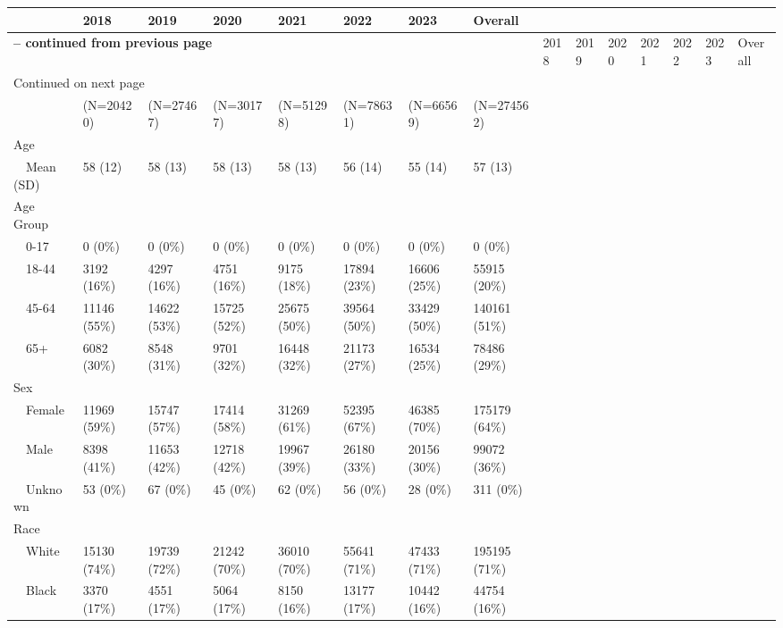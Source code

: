\begin{longtable}{p{}p{}p{}p{}p{}p{}p{}p{}}
   & 2018 & 2019 & 2020 & 2021 & 2022 & 2023 & Overall \\ 
  \hline 
\endfirsthead 
\multicolumn{8}{p{\textwidth}}{{ \bfseries \tablename \thetable{} -- continued from previous page}} \ 
\hline Feature & 2018 & 2019 & 2020 & 2021 & 2022 & 2023 & Overall \\ \hline 
\endhead 
\hline \multicolumn{8}{p{\textwidth}}{{Continued on next page}} \\ \hline 
\endfoot 
\hline 
\endlastfoot 
 \hline
 & (N=20420) & (N=27467) & (N=30177) & (N=51298) & (N=78631) & (N=66569) & (N=274562) \\ 
  Age &  &  &  &  &  &  &  \\ 
    Mean (SD) & 58 (12) & 58 (13) & 58 (13) & 58 (13) & 56 (14) & 55 (14) & 57 (13) \\ 
  Age Group &  &  &  &  &  &  &  \\ 
    0-17 & 0 (0\%) & 0 (0\%) & 0 (0\%) & 0 (0\%) & 0 (0\%) & 0 (0\%) & 0 (0\%) \\ 
    18-44 & 3192 (16\%) & 4297 (16\%) & 4751 (16\%) & 9175 (18\%) & 17894 (23\%) & 16606 (25\%) & 55915 (20\%) \\ 
    45-64 & 11146 (55\%) & 14622 (53\%) & 15725 (52\%) & 25675 (50\%) & 39564 (50\%) & 33429 (50\%) & 140161 (51\%) \\ 
    65+ & 6082 (30\%) & 8548 (31\%) & 9701 (32\%) & 16448 (32\%) & 21173 (27\%) & 16534 (25\%) & 78486 (29\%) \\ 
  Sex &  &  &  &  &  &  &  \\ 
    Female & 11969 (59\%) & 15747 (57\%) & 17414 (58\%) & 31269 (61\%) & 52395 (67\%) & 46385 (70\%) & 175179 (64\%) \\ 
    Male & 8398 (41\%) & 11653 (42\%) & 12718 (42\%) & 19967 (39\%) & 26180 (33\%) & 20156 (30\%) & 99072 (36\%) \\ 
    Unknown & 53 (0\%) & 67 (0\%) & 45 (0\%) & 62 (0\%) & 56 (0\%) & 28 (0\%) & 311 (0\%) \\ 
  Race &  &  &  &  &  &  &  \\ 
    White & 15130 (74\%) & 19739 (72\%) & 21242 (70\%) & 36010 (70\%) & 55641 (71\%) & 47433 (71\%) & 195195 (71\%) \\ 
    Black & 3370 (17\%) & 4551 (17\%) & 5064 (17\%) & 8150 (16\%) & 13177 (17\%) & 10442 (16\%) & 44754 (16\%) \\ 

\end{longtable}
